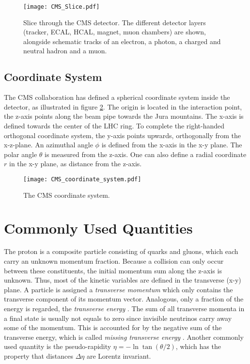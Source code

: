 \begin{figure}[htb]
	\centering
	\texttt{[image: CMS\_Slice.pdf]}
	\caption{Slice through the CMS detector. The different detector layers (tracker, ECAL, HCAL, magnet, muon chambers) are shown, alongside schematic tracks of an electron, a photon, a charged and neutral hadron and a muon.\cite[modified]{Barney2011CMS}}
	\label{fig:cms_slice}
\end{figure}

\subsection{Coordinate System}
The CMS collaboration has defined a spherical coordinate system inside the detector, as illustrated in figure \ref{fig:cms_coordinate_system}. The origin is located in the interaction point, the z-axis points along the beam pipe towards the Jura mountains. The x-axis is defined towards the center of the LHC ring. To complete the right-handed orthogonal coordinate system, the y-axis points upwards, orthogonally from the x-z-plane. 
An azimuthal angle $\phi$ is defined from the x-axis in the x-y plane. The polar angle $\theta$ is measured from the z-axis. One can also define a radial coordinate $r$ in the x-y plane, as distance from the z-axis.\cite[p. 2]{Co2008CMS} 
\begin{figure}[htb]
	\centering
	\texttt{[image: CMS\_coordinate\_system.pdf]}
	\caption{The CMS coordinate system.}
	\label{fig:cms_coordinate_system}
\end{figure}

\section{Commonly Used Quantities}
The proton is a composite particle consisting of quarks and gluons, which each carry an unknown momentum fraction. Because a collision can only occur between these constituents, the initial momentum sum along the z-axis is unknown.
Thus, most of the kinetic variables are defined in the transverse (x-y) plane. A particle is assigned a \emph{transverse momentum} \pT which only contains the transverse component of its momentum vector. Analogous, only a fraction of the energy is regarded, the \emph{transverse energy} \ET. 
The sum of all transverse momenta in a final state is usually not equals to zero since invisible neutrinos carry away some of the momentum. This is accounted for by the negative sum of the transverse energy, which is called \emph{missing transverse energy} \MET.
Another commonly used quantity is the pseudo-rapidity $\eta = -\ln \tan(\theta/2)$, which has the property that distances $\Delta\eta$ are Lorentz invariant.

